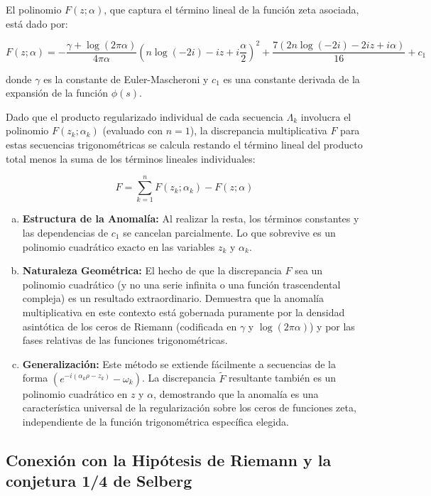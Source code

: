El polinomio $F(z; \alpha)$, que captura el término lineal de la función zeta asociada, está dado por:

$$ F(z; \alpha) = -\frac{\gamma + \log(2\pi\alpha)}{4\pi\alpha} \left( n \log(-2i) - iz + i\frac{\alpha}{2} \right)^2 + \frac{7(2n \log(-2i) - 2iz + i\alpha)}{16} + c_1 $$

donde $\gamma$ es la constante de Euler-Mascheroni y $c_1$ es una constante derivada de la expansión de la función $\phi(s)$.

Dado que el producto regularizado individual de cada secuencia $\Lambda_k$ involucra el polinomio $F(z_k; \alpha_k)$ (evaluado con $n=1$), la discrepancia multiplicativa $F$ para estas secuencias trigonométricas se calcula restando el término lineal del producto total menos la suma de los términos lineales individuales:

$$ F = \sum_{k=1}^n F(z_k; \alpha_k) - F(z; \alpha) $$

\begin{enumerate}[a)]
    \item \textbf{Estructura de la Anomalía:} Al realizar la resta, los términos constantes y las dependencias de $c_1$ se cancelan parcialmente. Lo que sobrevive es un polinomio cuadrático exacto en las variables $z_k$ y $\alpha_k$. 
    \item \textbf{Naturaleza Geométrica:} El hecho de que la discrepancia $F$ sea un polinomio cuadrático (y no una serie infinita o una función trascendental compleja) es un resultado extraordinario. Demuestra que la anomalía multiplicativa en este contexto está gobernada puramente por la densidad asintótica de los ceros de Riemann (codificada en $\gamma$ y $\log(2\pi\alpha)$) y por las fases relativas de las funciones trigonométricas.
    \item \textbf{Generalización:} Este método se extiende fácilmente a secuencias de la forma $(e^{-i(\alpha_k \rho - z_k)} - \omega_k)$. La discrepancia $\tilde{F}$ resultante también es un polinomio cuadrático en $z$ y $\alpha$, demostrando que la anomalía es una característica universal de la regularización sobre los ceros de funciones zeta, independiente de la función trigonométrica específica elegida.
\end{enumerate}

\subsection{Conexión con la Hipótesis de Riemann y la conjetura 1/4 de Selberg}

